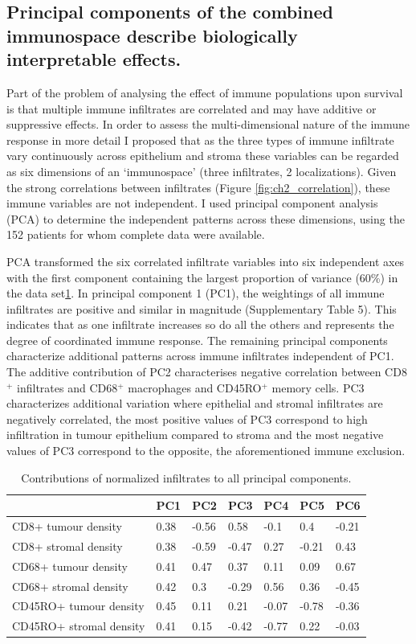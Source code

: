 \subsection{Principal components of the combined immunospace describe biologically interpretable effects.}
 Part of the problem of analysing the effect of immune populations upon survival is that multiple immune infiltrates are correlated and may have additive or suppressive effects.  In order to assess the multi-dimensional nature of the immune response in more detail I proposed that as the three types of immune infiltrate vary continuously across epithelium and stroma these variables can be regarded as six dimensions of an ‘immunospace’ (three infiltrates, 2 localizations).  Given the strong correlations between infiltrates (Figure \ref{fig:ch2_correlation}), these immune variables are not independent. I used principal component analysis (PCA) to determine the independent patterns across these dimensions, using the 152 patients for whom complete data were available.
 
 
 
 PCA transformed the six correlated infiltrate variables into six independent axes with the first component containing the largest proportion of variance (60\%) in the data set\ref{tab:PC}. In principal component 1 (PC1), the weightings of all immune infiltrates are positive and similar in magnitude (Supplementary Table 5). This indicates that as one infiltrate increases so do all the others and represents the degree of coordinated immune response. The remaining principal components characterize additional patterns across immune infiltrates independent of PC1. The additive contribution of PC2 characterises negative correlation between CD8$^+$ infiltrates and CD68$^+$ macrophages and CD45RO$^+$ memory cells. PC3 characterizes additional variation where epithelial and stromal infiltrates are negatively correlated, the most positive values of PC3 correspond to high infiltration in tumour epithelium compared to stroma and the most negative values of PC3 correspond to the opposite, the aforementioned immune exclusion. 
 
\begin{table}[]
    \centering
    \begin{tabular}{lllllll}
&PC1& PC2&PC3&PC4&PC5&PC6\\
\hline
CD8+ tumour density& 0.38&-0.56&0.58&-0.1&0.4&-0.21\\
CD8+ stromal density&0.38&-0.59&-0.47&0.27&-0.21&0.43\\
CD68+ tumour density&0.41&0.47&0.37&0.11&0.09&0.67\\
CD68+ stromal density&0.42&0.3&-0.29&0.56&0.36&-0.45\\
CD45RO+ tumour density&0.45&0.11&0.21&-0.07&-0.78&-0.36\\
CD45RO+ stromal density&0.41&0.15&-0.42&-0.77&0.22&-0.03\\
\hline
    \end{tabular}
    \caption{Contributions of normalized infiltrates to all principal components.}
    \label{tab:PC}
\end{table}


